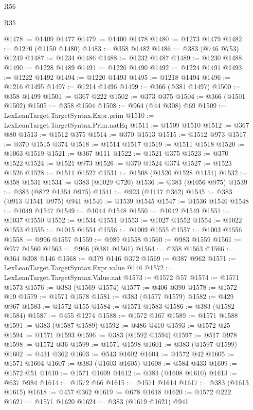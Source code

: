 \begin{lexlean}{R56}
\begin{lexlean}{R35}
\begin{coremodule}
{{{{{{{{{{{{{{{{{{{{{{{{{{{{{{{{{{{{{{{{{{{{{{{{{{{{@1478 := @1409 @1477
@1479 := @1400 @1478
@1480 := @1273 @1479
@1482 := @1270 (@1150 @1480)
@1483 := @358 @1482
@1486 := @383 (@746 @753) @1249
@1487 := @1234 @1486
@1488 := @1232 @1487
@1489 := @1230 @1488
@1490 := @1228 @1489
@1491 := @1226 @1490
@1492 := @1224 @1491
@1493 := @1222 @1492
@1494 := @1220 @1493
@1495 := @1218 @1494
@1496 := @1216 @1495
@1497 := @1214 @1496
@1499 := @366 (@381 @1497)
@1500 := @358 @1499
@1501 := @367 @222
@1502 := @373 @375
@1504 := @366 (@1501 @1502)
@1505 := @358 @1504
@1508 := @964 (@44 @308) @69
@1509 := LexLeanTarget.TargetSyntax.Expr.prim
@1510 := LexLeanTarget.TargetSyntax.Prim.natEq
@1511 := @1509 @1510
@1512 := @367 @80
@1513 := @1512 @375
@1514 := @370 @1513
@1515 := @1512 @973
@1517 := @370 @1515 @374
@1518 := @1514 @1517
@1519 := @1511 @1518
@1520 := @1063 @1519
@1521 := @367 @111
@1522 := @1521 @375
@1523 := @370 @1522
@1524 := @1521 @973
@1526 := @370 @1524 @374
@1527 := @1523 @1526
@1528 := @1511 @1527
@1531 := @1508 (@1520 @1528 @1154)
@1532 := @358 @1531
@1534 := @383 (@1029 @720)
@1536 := @383 (@1056 @975)
@1539 := @383 (@872 @1354 @975)
@1541 := @923 (@1117 @362)
@1545 := @383 (@913 @1541 @975) @941
@1546 := @1539 @1545
@1547 := @1536 @1546
@1548 := @1049 @1547
@1549 := @1044 @1548
@1550 := @1042 @1549
@1551 := @1037 @1550
@1552 := @1534 @1551
@1553 := @1027 @1552
@1554 := @1022 @1553
@1555 := @1015 @1554
@1556 := @1009 @1555
@1557 := @1003 @1556
@1558 := @996 @1557
@1559 := @989 @1558
@1560 := @983 @1559
@1561 := @977 @1560
@1563 := @966 (@381 @1561)
@1564 := @358 @1563
@1566 := @364 @308 @146
@1568 := @379 @146 @372
@1569 := @387 @962
@1571 := LexLeanTarget.TargetSyntax.Expr.value @146
@1572 := LexLeanTarget.TargetSyntax.Value.nat
@1573 := @1572 @57
@1574 := @1571 @1573
@1576 := @383 (@1569 @1574)
@1577 := @406 @390
@1578 := @1572 @19
@1579 := @1571 @1578
@1581 := @383 (@1577 @1579)
@1582 := @429 @967
@1583 := @1572 @155
@1584 := @1571 @1583
@1586 := @383 (@1582 @1584)
@1587 := @455 @1274
@1588 := @1572 @167
@1589 := @1571 @1588
@1591 := @383 (@1587 @1589)
@1592 := @486 @410
@1593 := @1572 @25
@1594 := @1571 @1593
@1596 := @383 (@1592 @1594)
@1597 := @517 @978
@1598 := @1572 @36
@1599 := @1571 @1598
@1601 := @383 (@1597 @1599)
@1602 := @431 @362
@1603 := @543 @1602
@1604 := @1572 @42
@1605 := @1571 @1604
@1607 := @383 (@1603 @1605)
@1608 := @584 @433
@1609 := @1572 @51
@1610 := @1571 @1609
@1612 := @383 (@1608 @1610)
@1613 := @637 @984
@1614 := @1572 @66
@1615 := @1571 @1614
@1617 := @383 (@1613 @1615)
@1618 := @457 @362
@1619 := @678 @1618
@1620 := @1572 @222
@1621 := @1571 @1620
@1624 := @383 (@1619 @1621) @941
}}}}}}}}}}}}}}}}}}}}}}}}}}}}}}}}}}}}}}}}}}}}}}}}}}}}
\end{coremodule}
\end{lexlean}
\end{lexlean}
